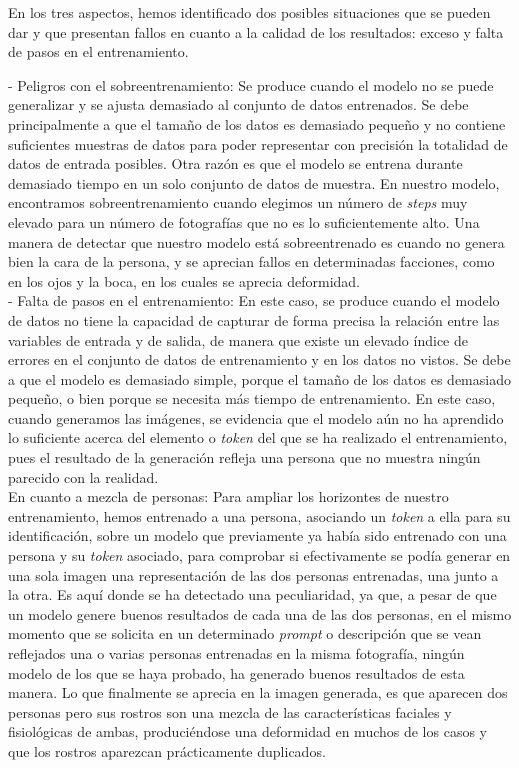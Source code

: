 En los tres aspectos, hemos identificado dos posibles situaciones que se pueden dar y que presentan fallos en cuanto a la calidad de los resultados: exceso y falta de pasos en el entrenamiento. 


- Peligros con el sobreentrenamiento: Se produce cuando el modelo no se puede generalizar y se ajusta demasiado al conjunto de datos entrenados. Se debe principalmente a que el tamaño de los datos es demasiado pequeño y no contiene suficientes muestras de datos para poder representar con precisión la totalidad de datos de entrada posibles. Otra razón es que el modelo se entrena durante demasiado tiempo en un solo conjunto de datos de muestra. En nuestro modelo, encontramos sobreentrenamiento cuando elegimos un número de \textit{steps} muy elevado para un número de fotografías que no es lo suficientemente alto. Una manera de detectar que nuestro modelo está sobreentrenado es cuando no genera bien la cara de la persona, y se aprecian fallos en determinadas facciones, como en los ojos y la boca, en los cuales se aprecia deformidad.\\

- Falta de pasos en el entrenamiento: En este caso, se produce cuando el modelo de datos no tiene la capacidad de capturar de forma precisa la relación entre las variables de entrada y de salida, de manera que existe un elevado índice de errores en el conjunto de datos de entrenamiento y en los datos no vistos. Se debe a que el modelo es demasiado simple, porque el tamaño de los datos es demasiado pequeño, o bien porque se necesita más tiempo de entrenamiento. En este caso, cuando generamos las imágenes, se evidencia que el modelo aún no ha aprendido lo suficiente acerca del elemento o \textit{token} del que se ha realizado el entrenamiento, pues el resultado de la generación refleja una persona que no muestra ningún parecido con la realidad.\\


En cuanto a mezcla de personas: Para ampliar los horizontes de nuestro entrenamiento, hemos entrenado a una persona, asociando un \textit{token} a ella para su identificación, sobre un modelo que previamente ya había sido entrenado con una persona y su \textit{token} asociado, para comprobar si efectivamente se podía generar en una sola imagen una representación de las dos personas entrenadas, una junto a la otra. Es aquí donde se ha detectado una peculiaridad, ya que, a pesar de que un modelo genere buenos resultados de cada una de las dos personas, en el mismo momento que se solicita en un determinado \textit{prompt} o descripción que se vean reflejados una o varias personas entrenadas en la misma fotografía, ningún modelo de los que se haya probado, ha generado buenos resultados de esta manera. Lo que finalmente se aprecia en la imagen generada, es que aparecen dos personas pero sus rostros son una mezcla de las características faciales y fisiológicas de ambas, produciéndose una deformidad en muchos de los casos y que los rostros aparezcan prácticamente duplicados.


